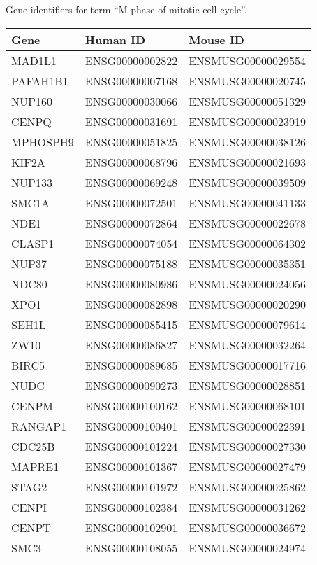     {Gene identifiers for  term “M phase of mitotic cell cycle”.}{}

\begin{longtable}{lll}
    \toprule
    Gene & Human ID & Mouse ID \\
    \midrule
    MAD1L1 & ENSG00000002822 & ENSMUSG00000029554 \\
    PAFAH1B1 & ENSG00000007168 & ENSMUSG00000020745 \\
    NUP160 & ENSG00000030066 & ENSMUSG00000051329 \\
    CENPQ & ENSG00000031691 & ENSMUSG00000023919 \\
    MPHOSPH9 & ENSG00000051825 & ENSMUSG00000038126 \\
    KIF2A & ENSG00000068796 & ENSMUSG00000021693 \\
    NUP133 & ENSG00000069248 & ENSMUSG00000039509 \\
    SMC1A & ENSG00000072501 & ENSMUSG00000041133 \\
    NDE1 & ENSG00000072864 & ENSMUSG00000022678 \\
    CLASP1 & ENSG00000074054 & ENSMUSG00000064302 \\
    NUP37 & ENSG00000075188 & ENSMUSG00000035351 \\
    NDC80 & ENSG00000080986 & ENSMUSG00000024056 \\
    XPO1 & ENSG00000082898 & ENSMUSG00000020290 \\
    SEH1L & ENSG00000085415 & ENSMUSG00000079614 \\
    ZW10 & ENSG00000086827 & ENSMUSG00000032264 \\
    BIRC5 & ENSG00000089685 & ENSMUSG00000017716 \\
    NUDC & ENSG00000090273 & ENSMUSG00000028851 \\
    CENPM & ENSG00000100162 & ENSMUSG00000068101 \\
    RANGAP1 & ENSG00000100401 & ENSMUSG00000022391 \\
    CDC25B & ENSG00000101224 & ENSMUSG00000027330 \\
    MAPRE1 & ENSG00000101367 & ENSMUSG00000027479 \\
    STAG2 & ENSG00000101972 & ENSMUSG00000025862 \\
    CENPI & ENSG00000102384 & ENSMUSG00000031262 \\
    CENPT & ENSG00000102901 & ENSMUSG00000036672 \\
    SMC3 & ENSG00000108055 & ENSMUSG00000024974 \\

\end{longtable}

